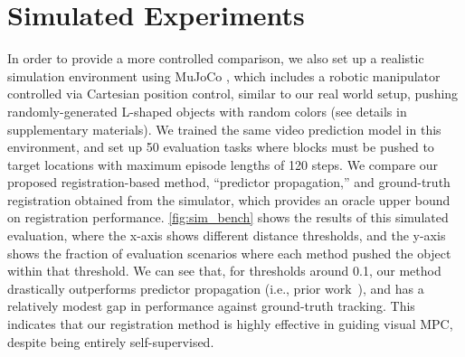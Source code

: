 \section{Simulated Experiments}

In order to provide a more controlled comparison, we also set up a realistic simulation environment using MuJoCo \cite{todorov2012mujoco}, which includes a robotic manipulator controlled via Cartesian position control, similar to our real world setup, pushing randomly-generated L-shaped objects with random colors (see details in supplementary materials). 
We trained the same video prediction model in this environment, and set up 50 evaluation tasks where blocks must be pushed to target locations with maximum episode lengths of 120 steps. 
We  compare our proposed registration-based method, ``predictor propagation,'' and ground-truth registration obtained from the simulator, which provides an oracle upper bound on registration performance. \autoref{fig:sim_bench} shows the results of this simulated evaluation, where the x-axis shows different distance thresholds, and the y-axis shows the fraction of evaluation scenarios where each method pushed the object within that threshold. We can see that, for thresholds around 0.1, our method drastically outperforms predictor propagation (i.e., prior work~\cite{sna}), and has a relatively modest gap in performance against ground-truth tracking. This indicates that our registration method is highly effective in guiding visual MPC, despite being entirely self-supervised.




